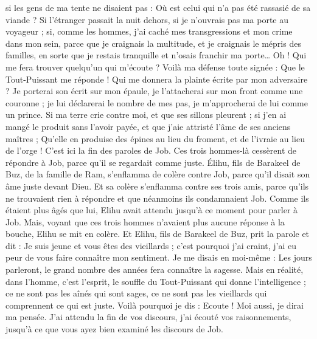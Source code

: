 \begin{multicols}{2}
si les gens de ma tente ne disaient pas : Où est celui qui n'a pas été rassasié de sa viande ?
Si l'étranger passait la nuit dehors, si je n'ouvrais pas ma porte au voyageur ;
si, comme les hommes, j'ai caché mes transgressions et mon crime dans mon sein,
parce que je craignais la multitude, et je craignais le mépris des familles, en sorte que je restais tranquille et n'osais franchir ma porte…
Oh ! Qui me fera trouver quelqu'un qui m'écoute ? Voilà ma défense toute signée : Que le Tout-Puissant me réponde ! Qui me donnera la plainte écrite par mon adversaire ?
Je porterai son écrit sur mon épaule, je l'attacherai sur mon front comme une couronne ;
je lui déclarerai le nombre de mes pas, je m'approcherai de lui comme un prince.
Si ma terre crie contre moi, et que ses sillons pleurent ;
si j'en ai mangé le produit sans l'avoir payée, et que j'aie attristé l'âme de ses anciens maîtres ;
Qu'elle en produise des épines au lieu du froment, et de l'ivraie au lieu de l'orge ! C'est ici la fin des paroles de Job.
\VerseOne{}Ces trois hommes-là cessèrent de répondre à Job, parce qu'il se regardait comme juste.
Élihu, fils de Barakeel de Buz, de la famille de Ram, s'enflamma de colère contre Job, parce qu'il disait son âme juste devant Dieu.
Et sa colère s'enflamma contre ses trois amis, parce qu'ils ne trouvaient rien à répondre et que néanmoins ils condamnaient Job.
Comme ils étaient plus âgés que lui, Elihu avait attendu jusqu'à ce moment pour parler à Job.
Mais, voyant que ces trois hommes n'avaient plus aucune réponse à la bouche, Elihu se mit en colère.
Et Elihu, fils de Barakeel de Buz, prit la parole et dit : Je suis jeune et vous êtes des vieillards ; c'est pourquoi j'ai craint, j'ai eu peur de vous faire connaître mon sentiment.
Je me disais en moi-même : Les jours parleront, le grand nombre des années fera connaître la sagesse.
Mais en réalité, dans l'homme, c'est l'esprit, le souffle du Tout-Puissant qui donne l'intelligence ;
ce ne sont pas les aînés qui sont sages, ce ne sont pas les vieillards qui comprennent ce qui est juste.
Voilà pourquoi je dis : Ecoute ! Moi aussi, je dirai ma pensée.
J'ai attendu la fin de vos discours, j'ai écouté vos raisonnements, jusqu'à ce que vous ayez bien examiné les discours de Job.

\end{multicols}
